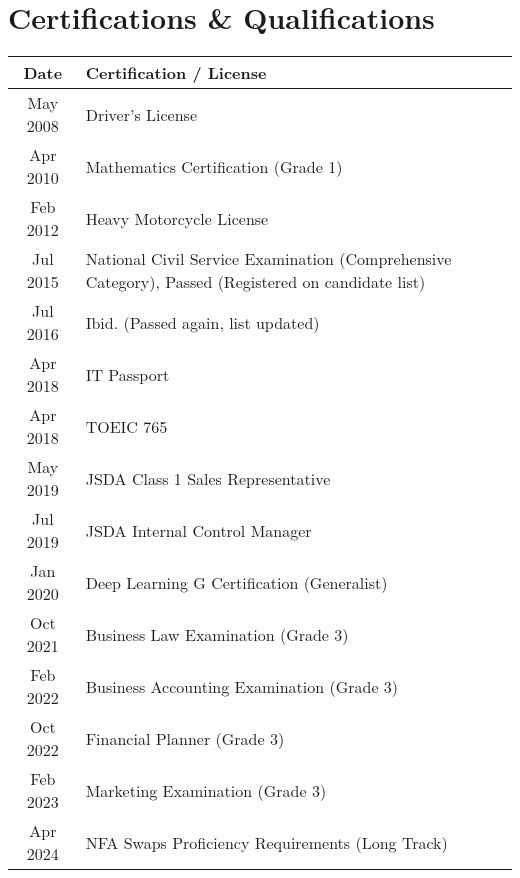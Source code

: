 \documentclass[uplatex,a4j,10.5pt,dvipdfmx]{jsarticle}
\begin{document}
\section*{Certifications \& Qualifications}

\begin{longtable}{|c|l|}
	\hline
	\centering\textbf{Date} & \textbf{Certification / License}                                                                   \\
	\hline
	\endhead

	\hline
	May 2008                & Driver's License                                                                                   \\
	\hline
	Apr 2010                & Mathematics Certification (Grade 1)                                                                \\
	\hline
	Feb 2012                & Heavy Motorcycle License                                                                           \\
	\hline
	Jul 2015                & National Civil Service Examination (Comprehensive Category), Passed (Registered on candidate list) \\
	\hline
	Jul 2016                & Ibid. (Passed again, list updated)                                                                 \\
	\hline
	Apr 2018                & IT Passport                                                                                        \\
	\hline
	Apr 2018                & TOEIC 765                                                                                          \\
	\hline
	May 2019                & JSDA Class 1 Sales Representative                                                                  \\
	\hline
	Jul 2019                & JSDA Internal Control Manager                                                                      \\
	\hline
	Jan 2020                & Deep Learning G Certification (Generalist)                                                         \\
	\hline
	Oct 2021                & Business Law Examination (Grade 3)                                                                 \\
	\hline
	Feb 2022                & Business Accounting Examination (Grade 3)                                                          \\
	\hline
	Oct 2022                & Financial Planner (Grade 3)                                                                        \\
	\hline
	Feb 2023                & Marketing Examination (Grade 3)                                                                    \\
	\hline
	Apr 2024                & NFA Swaps Proficiency Requirements (Long Track)                                                    \\
	\hline
\end{longtable}
\end{document}
